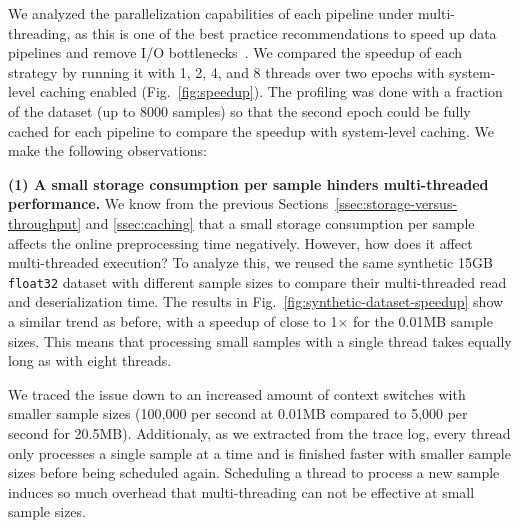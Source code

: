 {We analyzed the parallelization capabilities of each pipeline under multi-threading, as this is one of the best practice recommendations to speed up data pipelines and remove I/O bottlenecks~\cite{tfdatabestpractice2020}.
We compared the speedup of each strategy by running it with 1, 2, 4, and 8 threads over two epochs with system-level caching enabled (Fig.~\ref{fig:speedup}).
The profiling was done with a fraction of the dataset (up to 8000 samples) so that the second epoch could be fully cached for each pipeline to compare the speedup with system-level caching.
We make the following observations:

\textbf{(1) A small storage consumption per sample hinders multi-threaded performance.}
We know from the previous Sections~\ref{ssec:storage-versus-throughput} and \ref{ssec:caching} that a small storage consumption per sample affects the online preprocessing time negatively.
However, how does it affect multi-threaded execution?
To analyze this, we reused the same synthetic 15\:GB \texttt{float32} dataset with different sample sizes to compare their multi-threaded read and deserialization time.
The results in Fig.~\ref{fig:synthetic-dataset-speedup} show a similar trend as before, with a speedup of close to 1$\times$ for the 0.01\:MB sample sizes.
This means that processing small samples with a single thread takes equally long as with eight threads.
}
{\color{diff2}
We traced the issue down to an increased amount of context switches with smaller sample sizes (100,000 per second at 0.01\:MB compared to 5,000 per second for 20.5\:MB).
Additionaly, as we extracted from the trace log, every thread only processes a single sample at a time and is finished faster with smaller sample sizes before being scheduled again.
Scheduling a thread to process a new sample induces so much overhead that multi-threading can not be effective at small sample sizes.
}

